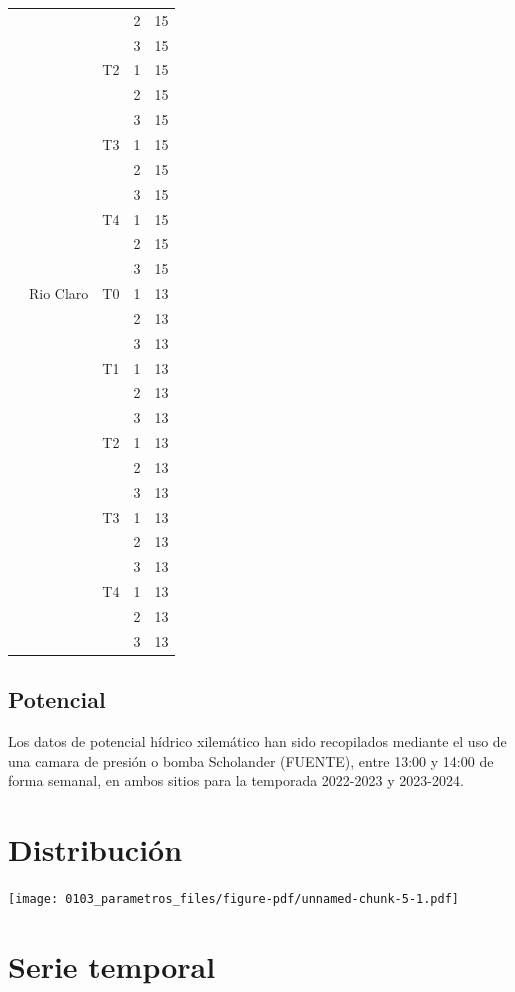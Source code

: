\documentclass[
  letterpaper,
  DIV=11,
  numbers=noendperiod]{scrreprt}
\begin{document}
\begin{longtable}[]{@{}llllr@{}}
& & & 2 & 15 \\
& & & 3 & 15 \\
& & T2 & 1 & 15 \\
& & & 2 & 15 \\
& & & 3 & 15 \\
& & T3 & 1 & 15 \\
& & & 2 & 15 \\
& & & 3 & 15 \\
& & T4 & 1 & 15 \\
& & & 2 & 15 \\
& & & 3 & 15 \\
& Rio Claro & T0 & 1 & 13 \\
& & & 2 & 13 \\
& & & 3 & 13 \\
& & T1 & 1 & 13 \\
& & & 2 & 13 \\
& & & 3 & 13 \\
& & T2 & 1 & 13 \\
& & & 2 & 13 \\
& & & 3 & 13 \\
& & T3 & 1 & 13 \\
& & & 2 & 13 \\
& & & 3 & 13 \\
& & T4 & 1 & 13 \\
& & & 2 & 13 \\
& & & 3 & 13 \\
\end{longtable}

\section{Potencial}\label{potencial}

Los datos de potencial hídrico xilemático han sido recopilados mediante
el uso de una camara de presión o bomba Scholander (FUENTE), entre 13:00
y 14:00 de forma semanal, en ambos sitios para la temporada 2022-2023 y
2023-2024.

\chapter{Distribución}

\begin{center}
\texttt{[image: 0103\_parametros\_files/figure-pdf/unnamed-chunk-5-1.pdf]}
\end{center}

\chapter{Serie temporal}
\end{document}
